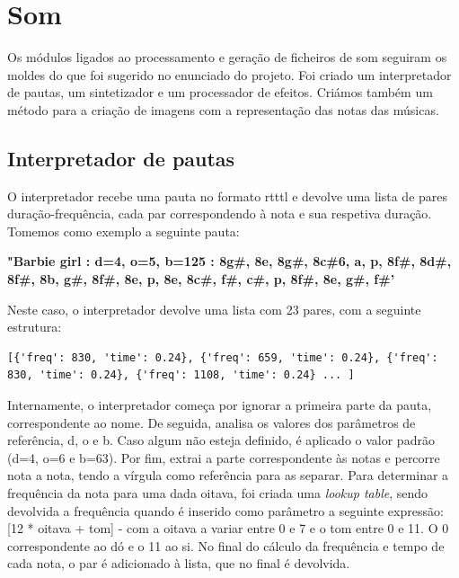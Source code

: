 \chapter{Som}
\label{chap.som}

Os módulos ligados ao processamento e geração de ficheiros de som seguiram os moldes do que foi sugerido no enunciado do projeto. Foi criado um interpretador de pautas, um sintetizador e um processador de efeitos. Criámos também um método para a criação de imagens com a representação das notas das músicas.

\section{Interpretador de pautas}

O interpretador recebe uma pauta no formato \ac{rtttl} e devolve uma lista de pares duração-frequência, cada par correspondendo à nota e sua respetiva duração. Tomemos como exemplo a seguinte pauta:

\vspace{5mm}
\textbf{"Barbie girl : d=4, o=5, b=125 : 8g\#, 8e, 8g\#, 8c\#6, a, p, 8f\#, 8d\#, 8f\#, 8b, g\#, 8f\#, 8e, p, 8e, 8c\#, f\#, c\#, p, 8f\#, 8e, g\#, f\#'}
\vspace{5mm}

Neste caso, o interpretador devolve uma lista com 23 pares, com a seguinte estrutura:

\vspace{5mm}
\begin{lstlisting}
[{'freq': 830, 'time': 0.24}, {'freq': 659, 'time': 0.24}, {'freq': 830, 'time': 0.24}, {'freq': 1108, 'time': 0.24} ... ]
\end{lstlisting}
\vspace{5mm}

Internamente, o interpretador começa por ignorar a primeira parte da pauta, correspondente ao nome. De seguida, analisa os valores dos parâmetros de referência, d, o e b. Caso algum não esteja definido, é aplicado o valor padrão (d=4, o=6 e b=63). Por fim, extrai a parte correspondente às notas e percorre nota a nota, tendo a vírgula como referência para as separar. Para determinar a frequência da nota para uma dada oitava, foi criada uma \emph{lookup table}, sendo devolvida a frequência quando é inserido como parâmetro a seguinte expressão: [12 * oitava + tom] - com a oitava a variar entre 0 e 7 e o tom entre 0 e 11. O 0 correspondente ao dó e o 11 ao si. No final do cálculo da frequência e tempo de cada nota, o par é adicionado à lista, que no final é devolvida.

